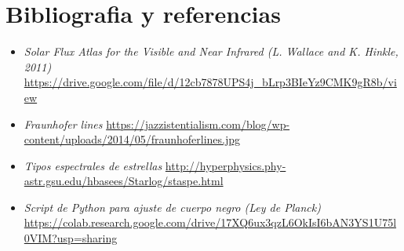 \documentclass[11pt, a4paper]{article}
\begin{document}
\vspace{0.1cm}
\hline
\vspace{0.1cm}
\section{Bibliografia y referencias}
\begin{itemize}
    \item \textit{Solar Flux Atlas for the Visible and Near Infrared (L. Wallace and K. Hinkle, 2011)} \url{https://drive.google.com/file/d/12cb7878UPS4j_bLrp3BIeYz9CMK9gR8b/view}
    \item \textit{Fraunhofer lines} \url{https://jazzistentialism.com/blog/wp-content/uploads/2014/05/fraunhoferlines.jpg}
    \item \textit{Tipos espectrales de estrellas} \url{http://hyperphysics.phy-astr.gsu.edu/hbasees/Starlog/staspe.html}
    \item \textit{Script de Python para ajuste de cuerpo negro (Ley de Planck)} \url{https://colab.research.google.com/drive/17XQ6ux3qzL6OkIsI6bAN3YS1U75l0VIM?usp=sharing}
\end{itemize}
\end{document}
